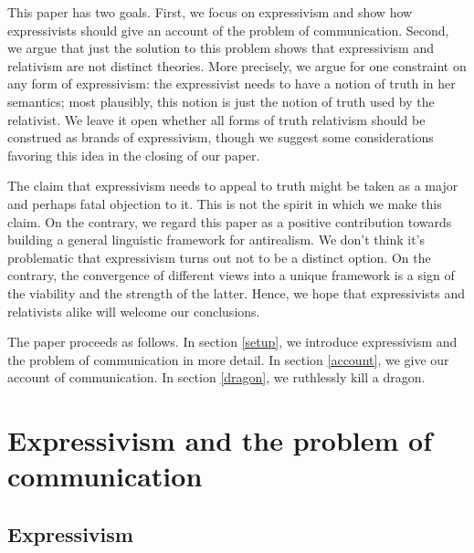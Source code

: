 \documentclass[11pt,article,oneside]{memoir}
\begin{document}
This paper has two goals. First, we focus on expressivism and show how expressivists should give an account of the problem of communication. Second, we argue that just the solution to this problem shows that expressivism and relativism are not distinct theories. More precisely, we argue for one constraint on any form of expressivism: the expressivist needs to have a notion of truth in her semantics; most plausibly, this notion is just the notion of truth used by the relativist. We leave it open whether all forms of truth relativism should be construed as brands of expressivism, though we suggest some considerations favoring this idea in the closing of our paper.

The claim that expressivism needs to appeal to truth might be taken as a major and perhaps fatal objection to it. This is not the spirit in which we make this claim. On the contrary, we regard this paper as a positive contribution towards building a general linguistic framework for antirealism. We don't think it's problematic that expressivism turns out not to be a distinct option. On the contrary, the convergence of different views into a unique framework is a sign of the viability and the strength of the latter. Hence, we hope that expressivists and relativists alike will welcome our conclusions. 

The paper proceeds as follows. In section \ref{setup}, we introduce expressivism and the problem of communication in more detail. In section \ref{account}, we give our account of communication. In section \ref{dragon}, we ruthlessly kill a dragon.

\section{Expressivism and the problem of communication}

\subsection{Expressivism}
\end{document}
